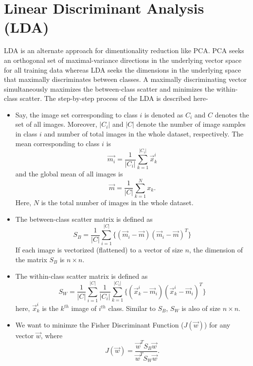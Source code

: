 \documentclass{article}
\begin{document}
\section{Linear Discriminant Analysis (LDA)}
LDA is an alternate approach for dimentionality reduction like PCA. PCA seeks an orthogonal set of maximal-variance directions in the underlying vector space for all training data whereas LDA seeks the dimensions in the underlying space that maximally discriminates between classes. A maximally discriminating vector simultaneously maximizes the between-class scatter and minimizes the within-class scatter. The step-by-step process of the LDA is described here-
\begin{itemize}
\item Say, the image set corresponding to class $i$ is denoted as $C_i$ and $C$ denotes the set of all images. Moreover, $|C_i|$ and $|C|$ denote the number of image samples in class $i$ and number of total images in the whole dataset, respectively. The mean corresponding to class $i$ is 
\begin{equation}
	\vec{m_i} = \frac{1}{|C_i|}\sum_{k=1}^{|C_i|}\vec{x}_{k}^i
\end{equation}
and the global mean of all images is 
\begin{equation}
	\vec{m} = \frac{1}{|C|}\sum_{k=1}^{N}x_k.
\end{equation}
Here, $N$ is the total number of images in the whole dataset.
\item The between-class scatter matrix is defined as
\begin{equation}
	S_B = \frac{1}{|C|}\sum_{i=1}^{|C|}\{(\vec{m}_i-\vec{m})(\vec{m}_i-\vec{m})^T\}
\end{equation}
If each image is vectorized (flattened) to a vector of size $n$, the dimension of the matrix $S_B$ is $n\times n$.
\item The within-class scatter matrix is defined as 
\begin{equation}
	S_W = \frac{1}{|C|}\sum_{i=1}^{|C|}\frac{1}{|C_i|}\sum_{k=1}^{|C_i|}\{(\vec{x}_k^i-\vec{m}_i)(\vec{x}_k^i-\vec{m}_i)^T\}
\end{equation}
here, $\vec{x}_k^i$ is the $k^{th}$ image of $i^{th}$ class. Similar to $S_B$, $S_W$ is also of size $n\times n$.
\item We want to minimze the Fisher Discriminant Function ($J(\vec{w})$) for any vector $\vec{w}$, where
\begin{equation}
	J(\vec{w}) = \frac{\vec{w}^TS_B\vec{w}}{\vec{w}^TS_W\vec{w}}.
\end{equation}

\end{itemize}
\end{document}
